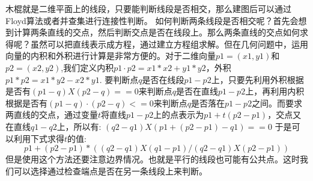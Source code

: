 木棍就是二维平面上的线段，只要能判断线段是否相交，那么建图后可以通过Floyd算法或者并查集进行连接性判断。 如何判断两条线段是否相交呢？首先会想到计算两条直线的交点，然后判断交点是否在线段上。那么两条直线的交点如何求得呢？虽然可以把直线表示成方程，通过建立方程组求解。但在几何问题中，运用向量的内积和外积进行计算是非常方便的。对于二维向量$p1=(x1,y1)$和$p2=(x2,y2)$,我们定义内积$p1·p2=x1*x2+y1*y2$，外积$p1 * p2=x1*y2-x2*y1$. 要判断点$q$是否在线段$p1-p2$上，只要先利用外积根据是否有$(p1-q)X(p2-q)==0$来判断点$q$是否在直线$p1-p2$上，再利用内积根据是否有$(p1-q)·(p2-q)<=0$来判断点$q$是否落在$p1-p2$之间。而要求两直线的交点，通过变量$t$将直线$p1-p2$上的点表示为$p1+t(p2-p1)$，交点又在直线$q1-q2$上，所以有: $(q2-q1)X(p1+(p2-p1)-q1)==0$ 于是可以利用下式求得$t$的值:$$p1+(p2-p1)*((q2-q1)X(q1-p1)/(q2-q1)X(p2-p1))$$
但是使用这个方法还要注意边界情况。也就是平行的线段也可能有公共点。这时我们可以选择通过检查端点是否在另一条线段上来判断。
